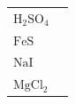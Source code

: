 \begin{enumerate}[noitemsep, label=\textbf{\arabic*}. ]
{\begin{tabular}[t]{|l|l|}
        \begin{math}\mathrm{H}{}_{2}\mathrm{SO}{}_{4}\end{math} &
    
    
     \tabularnewline\cline{1-1}\cline{2-2}
    
    
        \begin{math}\mathrm{FeS}\end{math} &
    
    
     \tabularnewline\cline{1-1}\cline{2-2}
    
    
        \begin{math}\mathrm{NaI}\end{math} &
    
    
     \tabularnewline\cline{1-1}\cline{2-2}
    
    
        \begin{math}\mathrm{MgCl}{}_{2}\end{math} &
    

\end{tabular}}
\end{enumerate}
